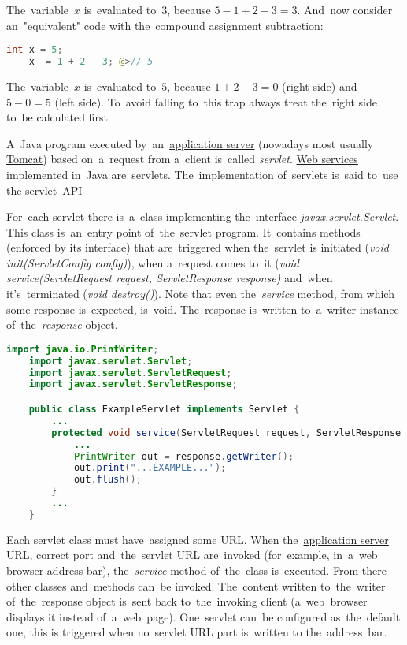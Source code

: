 \noindent The~variable~$x$ is~evaluated to~$3$, because $5-1+2-3=3$. And~now consider an~"equivalent" code with the~compound assignment subtraction:
\begin{lstlisting}[language=Java, frame=no]
    int x = 5;
    x -= 1 + 2 - 3; @>// 5
\end{lstlisting}

\noindent The~variable~$x$ is~evaluated to~$5$, because $1+2-3=0$ (right side) and~$5-0=5$ (left side). To~avoid falling to~this trap always treat the~right side to~be calculated first.

\label{serialization}

\label{servlet}
A~Java program executed by~an~\hyperref[applicationserver]{application server} (nowadays most usually \hyperref[tomcat]{Tomcat}) based on~a~request from a~client is~called \textit{servlet}. \hyperref[webserviceapplication]{Web services} implemented in~Java are~servlets. The~implementation of~servlets is~said to~use the servlet~\hyperref[api]{API}

For~each servlet there is~a~class implementing the~interface \textit{javax.servlet.Servlet}. This class is~an~entry point of~the~servlet program. It~contains methods (enforced by its interface) that are~triggered when the~servlet is initiated (\textit{void init(ServletConfig config)}), when a~request comes to~it (\textit{void service(ServletRequest request, ServletResponse response)} and~when it's~terminated (\textit{void destroy()}). Note that even the~\textit{service} method, from which some response is~expected, is~void. The~response is~written to~a~writer instance of~the~\textit{response} object.

\enlargethispage{10mm}
\example
\begin{lstlisting}[language=Java]
    import java.io.PrintWriter;
    import javax.servlet.Servlet;
    import javax.servlet.ServletRequest;
    import javax.servlet.ServletResponse;

    public class ExampleServlet implements Servlet {
        ...
        protected void service(ServletRequest request, ServletResponse response) {
            ...
            PrintWriter out = response.getWriter();
            out.print("...EXAMPLE...");
            out.flush();
        }
        ...
    }
\end{lstlisting}

\noindent Each servlet class must have~assigned some URL. When the~\hyperref[applicationserver]{application server} URL, correct port and~the~servlet URL are~invoked (for~example, in~a~web browser address bar), the~\textit{service} method of~the~class is~executed. From there other classes and~methods can~be invoked. The~content written to~the~writer of~the~response object is~sent back to~the~invoking client (a~web~browser displays it instead of~a~web~page). One~servlet can~be configured as~the~default one, this is triggered when no~servlet URL part is~written to the~address~bar.

